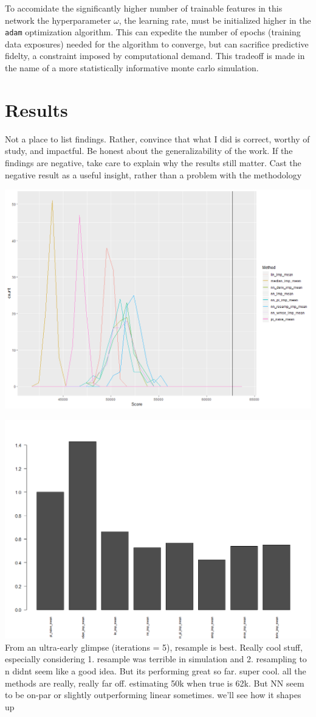 \documentclass[12pt,twoside]{reedthesis}
\begin{document}
To accomidate the significantly higher number of trainable features in
this network the hyperparameter \(\omega\), the learning rate, must be
initialized higher in the \texttt{adam} optimization algorithm. This can
expedite the number of epochs (training data exposures) needed for the
algorithm to converge, but can sacrifice predictive fidelty, a
constraint imposed by computational demand. This tradeoff is made in the
name of a more statistically informative monte carlo simulation.

\section{Results}\label{results}

Not a place to list findings. Rather, convince that what I did is
correct, worthy of study, and impactful. Be honest about the
generalizability of the work. If the findings are negative, take care to
explain why the results still matter. Cast the negative result as a
useful insight, rather than a problem with the methodology

\includegraphics[width=0.7\linewidth]{figure/vline_fig}

\includegraphics[width=0.7\linewidth]{figure/new_bar_results} From an
ultra-early glimpse (iterations = 5), resample is best. Really cool
stuff, especially considering 1. resample was terrible in simulation and
2. resampling to n didnt seem like a good idea. But its performing great
so far. super cool. all the methods are really, really far off.
estimating 50k when true is 62k. But NN seem to be on-par or slightly
outperforming linear sometimes. we'll see how it shapes up
\end{document}
